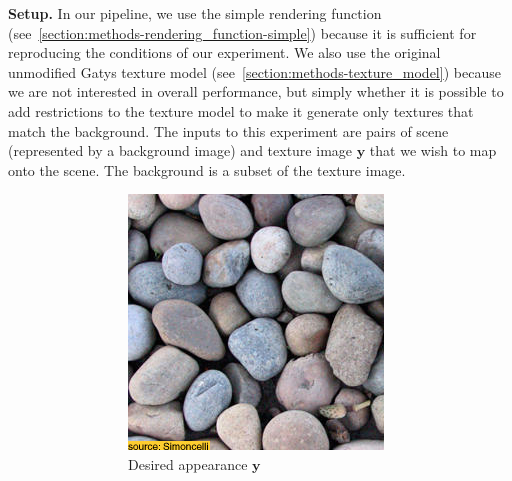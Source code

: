 \textbf{Setup.} In our pipeline, we use the simple rendering function (see~\ref{section:methods-rendering_function-simple}) because it is sufficient for reproducing the conditions of our experiment. We also use the original unmodified Gatys texture model (see~\ref{section:methods-texture_model}) because we are not interested in overall performance, but simply whether it is possible to add restrictions to the texture model to make it generate only textures that match the background. The inputs to this experiment are pairs of scene (represented by a background image) and texture image \(\bm{y}\) that we wish to map onto the scene. The background is a subset of the texture image.

\begin{figure}[]
    \centering    
    \begin{subfigure}{\textwidth}
        \centering
        \begin{subfigure}{0.24\textwidth}
            \centering
            \includegraphics[width=\textwidth]{images/04-experiment01/pebbles/target.jpg}
            \caption{Desired appearance \(\bm{y}\)}
            \label{fig:ex01-pebbles-1000steps-some_target}
        \end{subfigure}
        \hfill
        \begin{subfigure}{0.24\textwidth}
            \centering

\end{subfigure}
\end{subfigure}
\end{figure}
